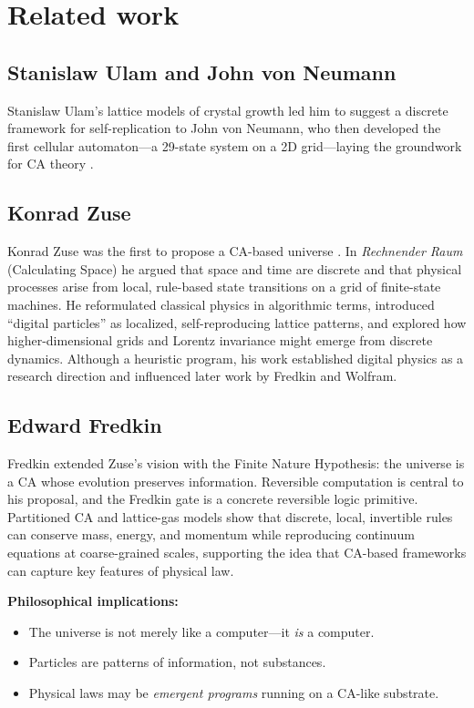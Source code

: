 \documentclass{ijuc}
\begin{document}
\section{Related work} \label{sec:related-work}

\subsection*{Stanislaw Ulam and John von Neumann}
Stanislaw Ulam's lattice models of crystal growth led him to suggest a discrete framework for self-replication to John von Neumann, who then developed the first cellular automaton---a 29-state system on a 2D grid---laying the groundwork for CA theory \cite{ulam1952,vonNeumann1966}.

\subsection*{Konrad Zuse}
Konrad Zuse was the first to propose a CA-based universe \cite{zuse}. In \emph{Rechnender Raum} (Calculating Space) he argued that space and time are discrete and that physical processes arise from local, rule-based state transitions on a grid of finite-state machines. He reformulated classical physics in algorithmic terms, introduced ``digital particles'' as localized, self-reproducing lattice patterns, and explored how higher-dimensional grids and Lorentz invariance might emerge from discrete dynamics. Although a heuristic program, his work established digital physics as a research direction and influenced later work by Fredkin and Wolfram.

\subsection*{Edward Fredkin}
Fredkin \cite{fredkin} extended Zuse's vision with the Finite Nature Hypothesis: the universe is a CA whose evolution preserves information. Reversible computation is central to his proposal, and the Fredkin gate is a concrete reversible logic primitive. Partitioned CA and lattice-gas models show that discrete, local, invertible rules can conserve mass, energy, and momentum while reproducing continuum equations at coarse-grained scales, supporting the idea that CA-based frameworks can capture key features of physical law.

\textbf{Philosophical implications:}
\begin{itemize}
  \item The universe is not merely like a computer---it \emph{is} a computer.
  \item Particles are patterns of information, not substances.
  \item Physical laws may be \emph{emergent programs} running on a CA-like substrate.
\end{itemize}
\end{document}
